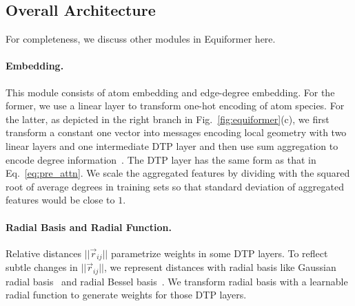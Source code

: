\vspace{-2mm}
\subsection{Overall Architecture}
\label{subsec:overall_architecture}
\vspace{-2mm}

For completeness, we discuss other modules in Equiformer here.

\vspace{-2.25mm}
\paragraph{Embedding.}
This module consists of atom embedding and edge-degree embedding.
For the former, we use a linear layer to transform one-hot encoding of atom species.
For the latter, as depicted in the right branch in  Fig.~\ref{fig:equiformer}(c), we first transform a constant one vector into messages encoding local geometry with two linear layers and one intermediate DTP layer and then use sum aggregation to encode degree information~\citep{gin, graphormer_3d}.
The DTP layer has the same form as that in Eq.~\ref{eq:pre_attn}.
We scale the aggregated features by dividing with the squared root of average degrees in training sets so that standard deviation of aggregated features would be close to $1$.


\vspace{-2.25mm}
\paragraph{Radial Basis and Radial Function.}
Relative distances $|| \vec{r}_{ij} ||$ parametrize weights in some DTP layers.
To reflect subtle changes in $|| \vec{r}_{ij} ||$, we represent distances with radial basis like Gaussian radial basis~\citep{schnet} and radial Bessel basis~\citep{dimenet, dimenet_pp}.
We transform radial basis with a learnable radial function to generate weights for those DTP layers.

